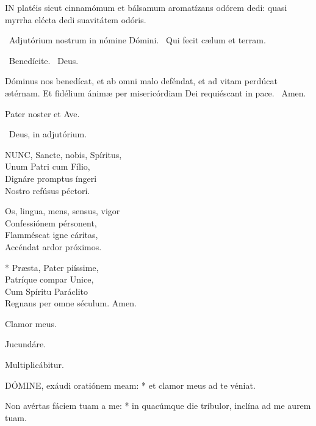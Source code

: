 
\lettrine[lines=2]{I}{N} platéis sicut cinnamómum et bálsamum aromatízans odórem dedi: quasi myrrha elécta dedi suavitátem odóris.

\sectionornament

\V\ Adjutórium nostrum in nómine Dómini. \R\ Qui fecit cælum et terram.

\V\ Benedícite. \R\ Deus.

 Dóminus nos benedícat, et ab omni malo deféndat, et ad vitam perdúcat ætérnam. Et fidélium ánimæ per misericórdiam Dei requiéscant in pace. \R\ Amen.


\sectionornament


Pater noster et Ave.

\V\ Deus, in adjutórium.


\lettrine[lines=2]{N}{UNC}, Sancte, nobis, Spíritus,\\
Unum Patri cum Fílio,\\
Dignáre promptus íngeri\\
Nostro refúsus péctori.

Os, lingua, mens, sensus, vigor\\
Confessiónem pérsonent,\\
Flamméscat igne cáritas,\\
Accéndat ardor próximos.

* Præsta, Pater piíssime,\\
Patríque compar Unice,\\
Cum Spíritu Paráclito\\
Regnans per omne séculum. Amen.

  Clamor meus.


  Jucundáre.

  Multiplicábitur.


\lettrine[lines=2]{D}{ÓMINE}, exáudi oratiónem meam: * et clamor meus ad te véniat.

Non avértas fáciem tuam a me: * in quacúmque die tríbulor, inclína ad me aurem tuam.

